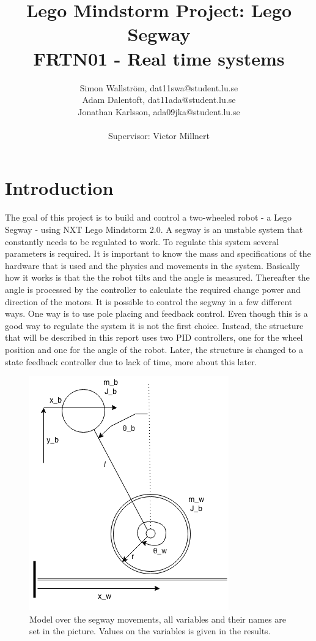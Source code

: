 \documentclass[a4paper]{article}
\title{Lego Mindstorm Project: Lego Segway\\
FRTN01 - Real time systems}
\author{Simon Wallström, dat11swa@student.lu.se\\
Adam Dalentoft, dat11ada@student.lu.se\\
Jonathan Karlsson, ada09jka@student.lu.se\\\\
Supervisor: Victor Millnert}
\begin{document}

\maketitle
\thispagestyle{empty}
\newpage
\setcounter{page}{1}
\tableofcontents
\newpage
\section{Introduction}
The goal of this project is to build and control a two-wheeled robot - a Lego Segway - using NXT Lego Mindstorm 2.0. A segway is an unstable system that constantly needs to be regulated to work. To regulate this system several parameters is required. It is important to know the mass and specifications of the hardware that is used and the physics and movements in the system. Basically how it works is that the the robot tilts and the angle is measured. Thereafter the angle is processed by the controller to calculate the required change power and direction of the motors. It is possible to control the segway in a few different ways. One way is to use pole placing and feedback control. Even though this is a good way to regulate the system it is not the first choice. Instead, the structure that will be described in this report uses two PID controllers, one for the wheel position and one for the angle of the robot. Later, the structure is changed to a state feedback controller due to lack of time, more about this later.

\begin{figure}[H]
 \centering
\includegraphics[scale=0.8]{pic/segway.png}
\caption{Model over the segway movements, all variables and their names are set in the picture. Values on the variables is given in the results.}
\end{figure}
\end{document}
